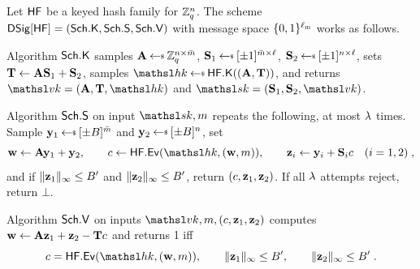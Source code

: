 \begin{construction} \label{constr-dil}
Let $\mathsf{HF}$ be a keyed hash family for $\mathbb{Z}_q^n$. The scheme $\mathsf{DSig}[\mathsf{HF}] = (\mathsf{Sch}.\mathsf{K}, \mathsf{Sch}.\mathsf{S}, \mathsf{Sch}.\mathsf{V})$ with message space $\{0,1\}^{\ell_{\mathrm{m}}}$ works as follows.

Algorithm $\mathsf{Sch}.\mathsf{K}$ samples $\mat{A} \getsr \Zq^{n\times\colsA}$, $\mat{S}_1 \getsr [\pm1]^{\colsA\times\ell}$, $\mat{S}_2 \getsr [\pm1]^{n\times\ell}$, sets $\mathbf{T} \gets \mathbf{A}\mathbf{S}_1 + \mathbf{S}_2$, samples $\hk \getsr \HFKg((\mat{A},\mat{T}))$, and returns $\vkey = (\mat{A}, \mat{T}, \hk)$ and $\skey = (\mat{S}_1, \mat{S}_2, \vkey)$.

Algorithm $\mathsf{Sch}.\mathsf{S}$ on input $\skey, m$ repeats the following, at most $\lambda$ times. Sample $\mat{y}_1 \getsr [\pm B]^{\colsA}$ and $\mat{y}_2 \getsr [\pm B]^{n}$, set
$$
\mat{w} \gets \mat{A}\mat{y}_1 + \mat{y}_2,
\qquad
c \gets \HFEv(\hk, (\mat{w}, m)),
\qquad
\mat{z}_i \gets \mat{y}_i + \mat{S}_i c \quad (i = 1,2) \;,
$$
and if $\|\mathbf{z}_1\|_\infty \le B'$ and $\|\mathbf{z}_2\|_\infty \le B'$, return $(c, \mathbf{z}_1, \mathbf{z}_2)$. If all $\lambda$ attempts reject, return $\bot$.

Algorithm $\mathsf{Sch}.\mathsf{V}$ on inputs $\vkey, m, (c, \mat{z}_1, \mat{z}_2)$ computes $\mathbf{w} \gets \mathbf{A}\mathbf{z}_1 + \mathbf{z}_2 - \mathbf{T}c$ and returns 1 iff
$$
c = \HFEv(\hk, (\mat{w}, m)),
\qquad
\|\mat{z}_1\|_\infty \le \Bclip,
\qquad
\|\mat{z}_2\|_\infty \le \Bclip \;.
$$
\end{construction}

